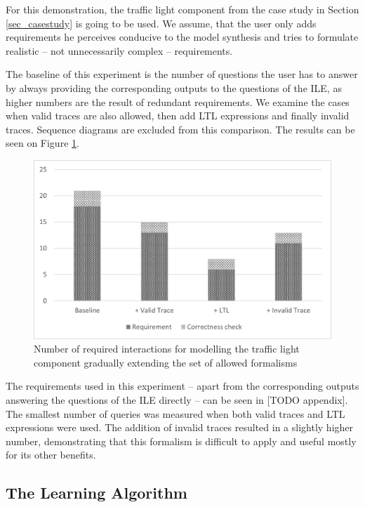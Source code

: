 For this demonstration, the traffic light component from the case study in Section \ref{sec_casestudy} is going to be used. We assume, that the user only adds requirements he perceives conducive to the model synthesis and tries to formulate realistic -- not unnecessarily complex -- requirements. 

The baseline of this experiment is the number of questions the user has to answer by always providing the corresponding outputs to the questions of the ILE, as higher numbers are the result of redundant requirements. We examine the cases when valid traces are also allowed, then add LTL expressions and finally invalid traces. Sequence diagrams are excluded from this comparison. The results can be seen on Figure \ref{fig_eval_trafficlightformalisms}.

\begin{figure}[!ht] 
	\centering
	\includegraphics[width=130mm, keepaspectratio]{figures/evaluation_trafficlightformalism.png}
	\caption{Number of required interactions for modelling the traffic light component gradually extending the set of allowed formalisms} 
	\label{fig_eval_trafficlightformalisms}
\end{figure}

The requirements used in this experiment -- apart from the corresponding outputs answering the questions of the ILE directly -- can be seen in [TODO appendix]. The smallest number of queries was measured when both valid traces and LTL expressions were used. The addition of invalid traces resulted in a slightly higher number, demonstrating that this formalism is difficult to apply and useful mostly for its other benefits.  
 
\subsection{The Learning Algorithm} \label{subs_evallearningalgo}

